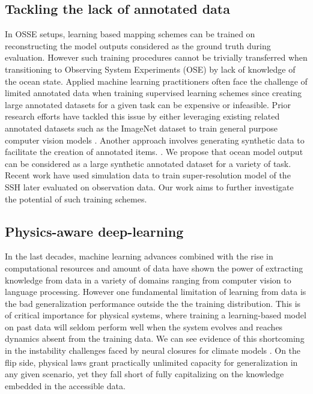 \documentclass[draft]{agujournal2019}
\begin{document}
\subsection{Tackling the lack of annotated data}
\label{ssec:transferlearning}
In OSSE setups, learning based mapping schemes can be trained on reconstructing the model outputs considered as the ground truth during evaluation. However such training procedures cannot be trivially transferred  when transitioning to Observing System Experiments (OSE) by lack of knowledge of the ocean state.
Applied machine learning practitioners often face the challenge of limited annotated data when training supervised learning schemes since creating large annotated datasets for a given task can be expensive or infeasible.
Prior research efforts have tackled this issue by either leveraging existing related annotated datasets such as the ImageNet\cite{dengImageNetLargescaleHierarchical2009} dataset to train general purpose computer vision models \cite{heDeepResidualLearning2016}. Another approach involves generating synthetic data to facilitate the creation of annotated items. \cite{gomezgonzalezVIPVortexImage2017,dosovitskiyFlowNetLearningOptical2015}.
We propose that ocean model output can be considered as a large synthetic annotated dataset for a variety of task. Recent work have used simulation data to train super-resolution model of the SSH \cite{buongiornonardelliSuperResolvingOceanDynamics2022} later evaluated on observation data. Our work aims to further investigate the potential of such training schemes. 



\subsection{Physics-aware deep-learning}
\label{ssec:deeplearning}
In the last decades, machine learning advances combined with the rise in computational resources and amount of data have shown the power of extracting knowledge from data in a variety of domains ranging from computer vision to language processing. 
However one fundamental limitation of learning from data is the bad generalization performance outside the the training distribution. This is of critical importance for physical systems, where training a learning-based model on past data will seldom perform well when the system evolves and reaches dynamics absent from the training data. We can see evidence of this shortcoming in the instability challenges faced by neural closures for climate models \cite{brenowitzInterpretingStabilizingMachineLearning2020}. 
On the flip side, physical laws grant practically unlimited capacity for generalization in any given scenario, yet they fall short of fully capitalizing on the knowledge embedded in the accessible data.
\end{document}
